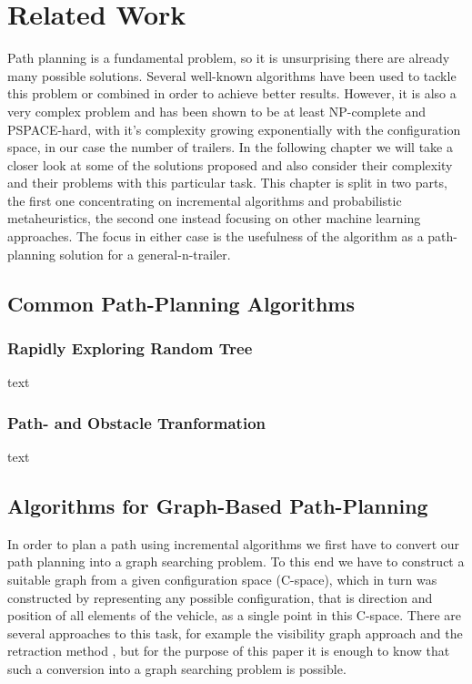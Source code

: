 \chapter{Related Work}
\label{cha:related_work}

Path planning is a fundamental problem, so it is unsurprising there are already many possible solutions. Several well-known algorithms have been used to tackle this problem or combined in order to achieve better results. However, it is also a very complex problem and has been shown to be at least NP-complete and PSPACE-hard, with it's complexity growing exponentially with the configuration space, in our case the number of trailers. \cite{1} In the following chapter we will take a closer look at some of the solutions proposed and also consider their complexity and their problems with this particular task. This chapter is split in two parts, the first one concentrating on incremental algorithms and probabilistic metaheuristics, the second one instead focusing on other machine learning approaches. The focus in either case is the usefulness of the algorithm as a path-planning solution for a general-n-trailer. \pagebreak[4]

\section{Common Path-Planning Algorithms}
\label{sec:common_pathplanning}

\subsection{Rapidly Exploring Random Tree}
\label{sec:rrt}

text

\subsection{Path- and Obstacle Tranformation}
\label{sec:pathtransformation}

text

\section{Algorithms for Graph-Based Path-Planning}
\label{sec:graphbased_pathplanning}

In order to plan a path using incremental algorithms we first have to convert our path planning into a graph searching problem. To this end we have to construct a suitable graph from a given configuration space (C-space), which in turn was constructed by representing any possible configuration, that is direction and position of all elements of the vehicle, as a single point in this C-space. There are several approaches to this task, for example the visibility graph approach \cite{2,3} and the retraction method \cite{4,5}, but for the purpose of this paper it is enough to know that such a conversion into a graph searching problem is possible. 

